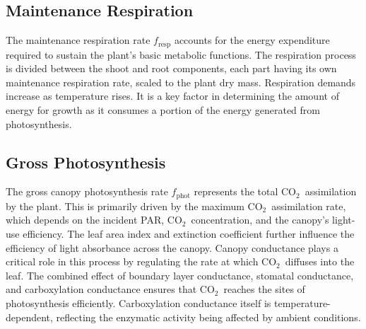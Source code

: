 \documentclass[conference]{IEEEtran}
\newcommand{\ui}[2]{#1_{\mathrm{#2}}}
\newcommand{\coo}{\ensuremath{\mathrm{CO_2}}}
\begin{document}
\subsection{Maintenance Respiration} The maintenance respiration rate \( \ui{f}{resp} \) accounts for the energy expenditure required to sustain the plant's basic metabolic functions. The respiration process is divided between the shoot and root components, each part having its own maintenance respiration rate, scaled to the plant dry mass. Respiration demands increase as temperature rises. It is a key factor in determining the amount of energy for growth as it consumes a portion of the energy generated from photosynthesis.

\subsection{Gross Photosynthesis} The gross canopy photosynthesis rate \( \ui{f}{phot} \) represents the total \coo\ assimilation by the plant. This is primarily driven by the maximum \coo\ assimilation rate, which depends on the incident PAR, \coo\ concentration, and the canopy's light-use efficiency. The leaf area index and extinction coefficient further influence the efficiency of light absorbance across the canopy. Canopy conductance plays a critical role in this process by regulating the rate at which \coo\ diffuses into the leaf. The combined effect of boundary layer conductance, stomatal conductance, and carboxylation conductance ensures that \coo\ reaches the sites of photosynthesis efficiently. Carboxylation conductance itself is temperature-dependent, reflecting the enzymatic activity being affected by ambient conditions.
%



\end{document}

